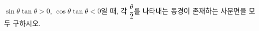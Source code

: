 $\sin\theta\tan\theta>0$, $\cos\theta\tan\theta<0$일 때, 각 $\dfrac{\theta}{2}$를 나타내는 동경이 존재하는 사분면을 모두 구하시오.
